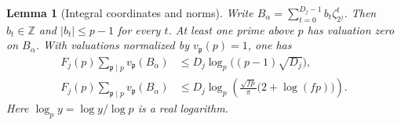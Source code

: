 \documentclass[a4paper,11pt]{article}
\newtheorem{lemma}[proposition]{Lemma}
\theoremstyle{definition}
\theoremstyle{remark}
\newcommand{\ZZ}{\mathbb Z}\newcommand{\ord}{\operatorname{ord}}
\numberwithin{equation}{section}
\begin{document}
\begin{lemma}[Integral coordinates and norms]\label{lem:coord139}
Write \(B_\alpha=\sum_{t=0}^{D_j-1}b_t\zeta_{2^j}^t\).
Then \(b_t\in\ZZ\) and \(|b_t|\le p-1\) for every \(t\).
At least one prime above \(p\) has valuation zero on \(B_\alpha\).
With valuations normalized by \(v_{\mathfrak p}(p)=1\), one has
\begin{align}
 F_j(p)\sum_{\mathfrak p\mid p}v_{\mathfrak p}(B_\alpha)
   &\le D_j\log_p\!\bigl((p-1)\sqrt{D_j}\bigr),\label{eq:ord139}\\
 F_j(p)\sum_{\mathfrak p\mid p}v_{\mathfrak p}(B_\alpha)
   &\le D_j\log_p\!\left(
                 \frac{\sqrt{fp}}{\pi}\bigl(2+\log(fp)\bigr)\right).
                 \label{eq:arch139}
\end{align}
Here \(\log_p y=\log y/\log p\) is a real logarithm.
\end{lemma}
\end{document}

